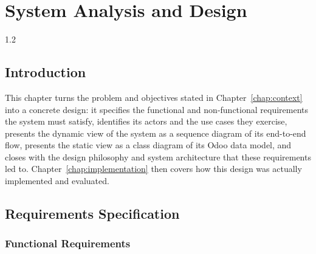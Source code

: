 \chapter{System Analysis and Design}
\label{chap:design}
\begin{spacing}{1.2}
\minitoc
\thispagestyle{MyStyle}
\end{spacing}
\newpage

\section{Introduction}

This chapter turns the problem and objectives stated in
Chapter~\ref{chap:context} into a concrete design: it specifies the
functional and non-functional requirements the system must satisfy,
identifies its actors and the use cases they exercise, presents the
dynamic view of the system as a sequence diagram of its end-to-end flow,
presents the static view as a class diagram of its Odoo data model, and
closes with the design philosophy and system architecture that these
requirements led to. Chapter~\ref{chap:implementation} then covers how
this design was actually implemented and evaluated.

\section{Requirements Specification}

\subsection{Functional Requirements}

